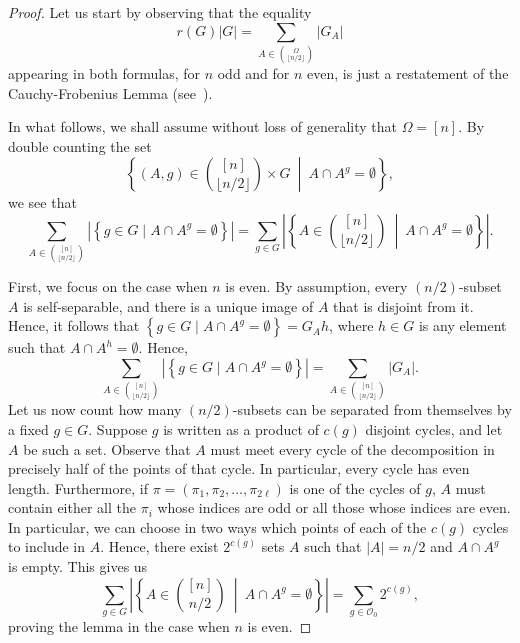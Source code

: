\documentclass[a4paper]{amsart}
\theoremstyle{definition}
\begin{document}
\begin{proof}
Let us start by observing that the equality
\[r(G) |G| = \sum_{A \in  {\Omega \choose \lfloor n/2\rfloor}}|G_A|\]
appearing in both formulas, for $n$ odd and for $n$ even, is just a restatement of the Cauchy-Frobenius Lemma (see~\cite[Theorem~1.7A]{DixonMortimer}).

In what follows, we shall
assume without loss of generality that $\Omega = [n]$. By double counting the set
    \[ \left\lbrace (A,g) \in {[n] \choose \lfloor n/2\rfloor } \times G \>  \middle\vert \> A\cap A^g = \emptyset \right\rbrace, \]
    we see that \begin{equation}\label{eq:itsJustDoubleCounting}
    \sum_{A \in {[n] \choose \lfloor n/2\rfloor }} \left| \left\lbrace g \in G \mid A\cap A^g = \emptyset  \right\rbrace \right| = \sum_{g\in G} \left| \left\lbrace A \in {[n] \choose \lfloor n/2\rfloor} \> \middle\vert\> A\cap A^g = \emptyset  \right\rbrace \right| .
    \end{equation}
    
    First, we focus on the case when $n$ is even. By assumption, every $(n/2)$-subset $A$ is self-separable, and there is a unique image of $A$ that is disjoint from it. Hence, it follows that
    $\left\lbrace g \in G \mid A\cap A^g = \emptyset  \right\rbrace = G_Ah$,
    where $h\in G$ is any element such that $A\cap A^h = \emptyset$. Hence,
    \[ \sum_{A \in {[n] \choose \lfloor n/2\rfloor }} \left| \left\lbrace g \in G \mid A\cap A^g = \emptyset  \right\rbrace \right| = \sum_{A \in {[n] \choose \lfloor n/2\rfloor }} |G_A| .\]
    Let us now count how many $(n/2)$-subsets can be separated from themselves by a fixed $g \in G$.
    Suppose $g$ is written as a product of $c(g)$ disjoint cycles, and let $A$ be such a set. Observe that $A$ must meet every cycle of the decomposition in precisely half of the points of that cycle. In particular, every cycle has even length.
    Furthermore, if $\pi=(\pi_1,\pi_2,\dots,\pi_{2\ell})$ is one of the cycles of $g$, $A$ must contain either all the $\pi_i$ whose indices are odd or all those whose indices are even. In particular, we can choose in two ways which points of each of the $c(g)$ cycles to include in $A$. Hence, there exist $2^{c(g)}$ sets $A$ such that $|A| = n/2$ and $A \cap A^g$ is empty. This gives us
    \[ \sum_{g\in G} \left| \left\lbrace A \in {[n] \choose n/2} \> \middle\vert \> A\cap A^g = \emptyset  \right\rbrace \right| = \sum_{g\in  \mathcal{O}_0} 2^{c(g)}, \]
    proving the lemma in the case when $n$ is even.


\end{proof}
\end{document}
